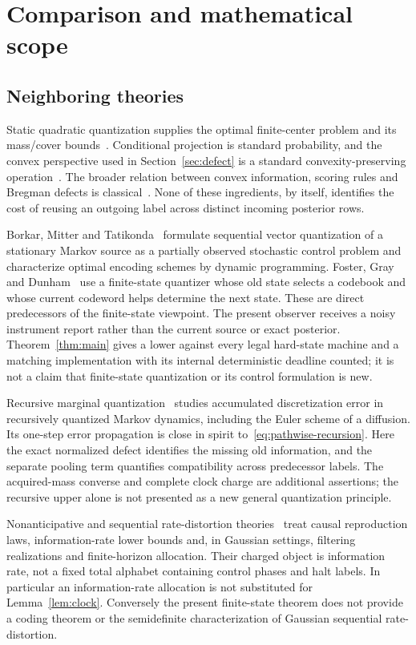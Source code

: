 \section{Comparison and mathematical scope}\label{sec:comparison}
\subsection{Neighboring theories}
Static quadratic quantization supplies the optimal finite-center problem and its mass/cover bounds~\cite{graf}. Conditional projection is standard probability, and the convex perspective used in Section~\ref{sec:defect} is a standard convexity-preserving operation~\cite{boyd}. The broader relation between convex information, scoring rules and Bregman defects is classical~\cite{gneiting}. None of these ingredients, by itself, identifies the cost of reusing an outgoing label across distinct incoming posterior rows.

Borkar, Mitter and Tatikonda~\cite{borkar} formulate sequential vector quantization of a stationary Markov source as a partially observed stochastic control problem and characterize optimal encoding schemes by dynamic programming. Foster, Gray and Dunham~\cite{foster} use a finite-state quantizer whose old state selects a codebook and whose current codeword helps determine the next state. These are direct predecessors of the finite-state viewpoint. The present observer receives a noisy instrument report rather than the current source or exact posterior. Theorem~\ref{thm:main} gives a lower against every legal hard-state machine and a matching implementation with its internal deterministic deadline counted; it is not a claim that finite-state quantization or its control formulation is new.

Recursive marginal quantization~\cite{pages} studies accumulated discretization error in recursively quantized Markov dynamics, including the Euler scheme of a diffusion. Its one-step error propagation is close in spirit to~\eqref{eq:pathwise-recursion}. Here the exact normalized defect identifies the missing old information, and the separate pooling term quantifies compatibility across predecessor labels. The acquired-mass converse and complete clock charge are additional assertions; the recursive upper alone is not presented as a new general quantization principle.

Nonanticipative and sequential rate-distortion theories~\cite{stavrou2014,stavrou2018,tanaka} treat causal reproduction laws, information-rate lower bounds and, in Gaussian settings, filtering realizations and finite-horizon allocation. Their charged object is information rate, not a fixed total alphabet containing control phases and halt labels. In particular an information-rate allocation is not substituted for Lemma~\ref{lem:clock}. Conversely the present finite-state theorem does not provide a coding theorem or the semidefinite characterization of Gaussian sequential rate-distortion.

